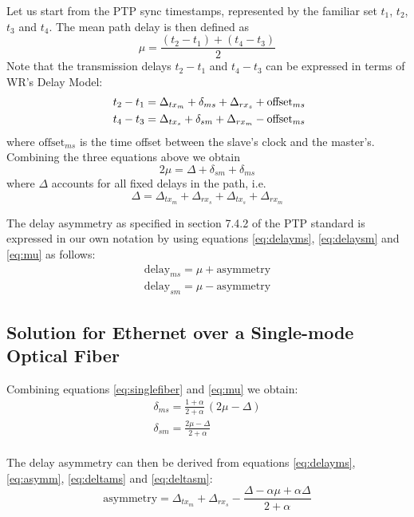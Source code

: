\documentclass[a4paper, 12pt]{article}
\newcommand{\eqoffset}[1]{%
  {\ensuremath{%
      {\text{offset}}_{#1}}%
  }%
}
\newcommand{\eqdelay}[1]{{\text{delay}}_{#1}}
\newcommand{\eqasymm}{{\text{asymmetry}}}
\begin{document}
Let us start from the PTP sync timestamps, represented by the familiar
set $t_1$, $t_2$, $t_3$ and $t_4$. The mean path delay is then defined as
\begin{equation}
\label{eq:meanPath}
  \mu = \frac{(t_2 - t_1) + (t_4 - t_3)}{2}
\end{equation}
Note that the transmission delays $t_2 - t_1$ and $t_4 - t_3$ can be
expressed in terms of WR's Delay Model:
\begin{align}
\
  t_2 - t_1 = \Delta_{tx_m} + \delta_{ms} + \Delta_{rx_s} + \eqoffset{ms}\\
  t_4 - t_3 = \Delta_{tx_s} + \delta_{sm} + \Delta_{rx_m} - \eqoffset{ms}
\end{align} where \eqoffset{ms} is the time offset between the
slave's clock and the master's. Combining the three equations above
we obtain
\begin{equation}
\label{eq:mu}
  2\mu = \Delta + \delta_{sm} + \delta_{ms}
\end{equation} where $\Delta$ accounts for all fixed delays in the path,
i.e.
\begin{equation}
\label{eq:delta}
  \Delta = \Delta_{tx_m} + \Delta_{rx_s} + \Delta_{tx_s} + \Delta_{rx_m}
\end{equation}

The delay asymmetry as specified in section 7.4.2 of the PTP standard is expressed in our own 
notation by using equations \eqref{eq:delayms},
\eqref{eq:delaysm} and \eqref{eq:mu} as follows:
\begin{align}
  \eqdelay{ms} = \mu + \eqasymm
  \label{eq:asymm} \\
  \eqdelay{sm} = \mu - \eqasymm
\end{align}


\subsection{Solution for Ethernet over a Single-mode Optical Fiber}
\label{sec:EthernetOverSingleModeFiber}
Combining equations \eqref{eq:singlefiber} and \eqref{eq:mu} we obtain:
\begin{gather}
  \delta_{ms} = \frac{1 + \alpha}{2 + \alpha} \, (2\mu - \Delta)
  \label{eq:deltams} \\
  \delta_{sm} = \frac{2\mu - \Delta}{2 + \alpha}
  \label{eq:deltasm}
\end{gather}
\\
The delay asymmetry can then be derived from equations \eqref{eq:delayms}, \eqref{eq:asymm}, 
\eqref{eq:deltams} and
\eqref{eq:deltasm}:
\begin{equation}
\label{eq:aqasymm}
  \eqasymm = \Delta_{tx_m} + \Delta_{rx_s} - \frac{\Delta - \alpha \mu + \alpha \Delta}{2 + \alpha}
\end{equation}
\\
\end{document}
